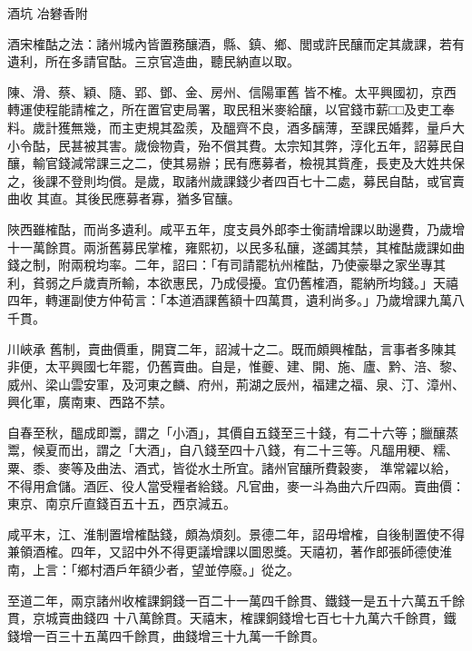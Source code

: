 
\begin{pinyinscope}

 酒坑
 冶礬香附



 酒宋榷酤之法：諸州城內皆置務釀酒，縣、鎮、鄉、閭或許民釀而定其歲課，若有遺利，所在多請官酤。三京官造曲，聽民納直以取。



 陳、滑、蔡、穎、隨、郢、鄧、金、房州、信陽軍舊
 皆不榷。太平興國初，京西轉運使程能請榷之，所在置官吏局署，取民租米麥給釀，以官錢市薪□□及吏工奉料。歲計獲無幾，而主吏規其盈羨，及醞齊不良，酒多醨薄，至課民婚葬，量戶大小令酤，民甚被其害。歲儉物貴，殆不償其費。太宗知其弊，淳化五年，詔募民自釀，輸官錢減常課三之二，使其易辦；民有應募者，檢視其貲產，長吏及大姓共保之，後課不登則均償。是歲，取諸州歲課錢少者四百七十二處，募民自酤，或官賣曲收
 其直。其後民應募者寡，猶多官釀。



 陜西雖榷酤，而尚多遺利。咸平五年，度支員外郎李士衡請增課以助邊費，乃歲增十一萬餘貫。兩浙舊募民掌榷，雍熙初，以民多私釀，遂蠲其禁，其榷酤歲課如曲錢之制，附兩稅均率。二年，詔曰：「有司請罷杭州榷酤，乃使豪舉之家坐專其利，貧弱之戶歲責所輸，本欲惠民，乃成侵擾。宜仍舊榷酒，罷納所均錢。」天禧四年，轉運副使方仲荀言：「本道酒課舊額十四萬貫，遺利尚多。」乃歲增課九萬八千貫。



 川峽承
 舊制，賣曲價重，開寶二年，詔減十之二。既而頗興榷酤，言事者多陳其非便，太平興國七年罷，仍舊賣曲。自是，惟夔、建、開、施、廬、黔、涪、黎、威州、梁山雲安軍，及河東之麟、府州，荊湖之辰州，福建之福、泉、汀、漳州、興化軍，廣南東、西路不禁。



 自春至秋，醞成即鬻，謂之「小酒」，其價自五錢至三十錢，有二十六等；臘釀蒸鬻，候夏而出，謂之「大酒」，自八錢至四十八錢，有二十三等。凡醞用粳、糯、粟、黍、麥等及曲法、酒式，皆從水土所宜。諸州官釀所費穀麥，
 準常糴以給，不得用倉儲。酒匠、役人當受糧者給錢。凡官曲，麥一斗為曲六斤四兩。賣曲價：東京、南京斤直錢百五十五，西京減五。



 咸平末，江、淮制置增榷酤錢，頗為煩刻。景德二年，詔毋增榷，自後制置使不得兼領酒榷。四年，又詔中外不得更議增課以圖恩獎。天禧初，著作郎張師德使淮南，上言：「鄉村酒戶年額少者，望並停廢。」從之。



 至道二年，兩京諸州收榷課銅錢一百二十一萬四千餘貫、鐵錢一是五十六萬五千餘貫，京城賣曲錢四
 十八萬餘貫。天禧末，榷課銅錢增七百七十九萬六千餘貫，鐵錢增一百三十五萬四千餘貫，曲錢增三十九萬一千餘貫。




\end{pinyinscope}
